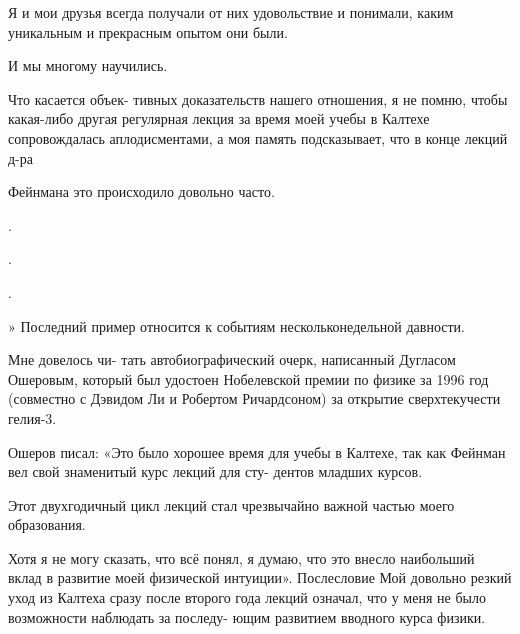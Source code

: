 \documentclass[11pt,oneside]{article}
\begin{document}
Я и мои друзья всегда получали от них удовольствие и понимали, каким уникальным и прекрасным опытом они были.\par



И мы многому научились.\par



Что касается объек- тивных доказательств нашего отношения, я не помню, чтобы какая-либо другая регулярная лекция за время моей учебы в Калтехе сопровождалась аплодисментами, а моя память подсказывает, что в конце лекций д-ра\par



Фейнмана это происходило довольно часто.\par



.\par



.\par



.\par



» Последний пример относится к событиям нескольконедельной давности.\par



Мне довелось чи- тать автобиографический очерк, написанный Дугласом Ошеровым, который был удостоен Нобелевской премии по физике за 1996 год (совместно с Дэвидом Ли и Робертом Ричардсоном) за открытие сверхтекучести гелия-3.\par



Ошеров писал: «Это было хорошее время для учебы в Калтехе, так как Фейнман вел свой знаменитый курс лекций для сту- дентов младших курсов.\par



Этот двухгодичный цикл лекций стал чрезвычайно важной частью моего образования.\par



Хотя я не могу сказать, что всё понял, я думаю, что это внесло наибольший вклад в развитие моей физической интуиции». Послесловие Мой довольно резкий уход из Калтеха сразу после второго года лекций означал, что у меня не было возможности наблюдать за последу- ющим развитием вводного курса физики.\par
\end{document}
